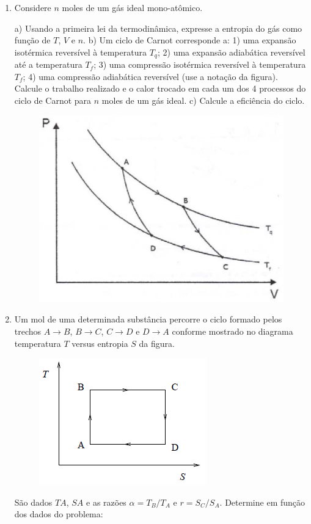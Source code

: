 \begin{enumerate}[start=1,label={\bfseries Q\arabic*.}]
\item Considere $n$ moles de um gás ideal mono-atômico.


  a) Usando a primeira lei da termodinâmica, expresse a entropia do gás como função de $T$, $V$ e $n$.
  b) Um ciclo de Carnot corresponde a: 1) uma expansão isotérmica reversível à temperatura $T_{q}$; 2) uma expansão adiabática reversível até a temperatura $T_{f}$; 3) uma compressão isotérmica reversível à temperatura $T_{f}$; 4) uma compressão adiabática reversível (use a notação da figura). Calcule o trabalho realizado e o calor trocado em cada um dos 4 processos do ciclo de Carnot para $n$ moles de um gás ideal.
  c) Calcule a eficiência do ciclo.

\begin{figure}[H]
  \centering
  \includegraphics[scale=0.6]{termica-img/isoterma.png}
\end{figure}



\item Um mol de uma determinada substância percorre o ciclo formado pelos trechos $A \rightarrow B$, $B \rightarrow C$, $C \rightarrow D$ e $D \rightarrow A$ conforme mostrado no diagrama temperatura $T$ versus entropia $S$ da figura.
\begin{figure}[H]
  \centering
  \includegraphics[scale=0.6]{termica-img/diagrama.png}
\end{figure}
São dados $TA$, $SA$ e as razões $\alpha = T_{B}/T_{A}$ e $r = S_{C}/S_{A}$. Determine em função dos dados do problema:


\end{enumerate}
